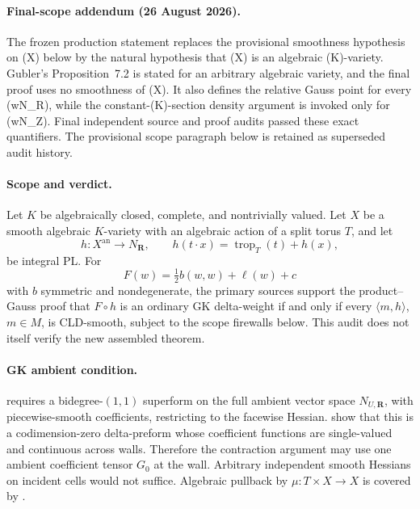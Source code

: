 
\paragraph{Final-scope addendum (26 August 2026).}
The frozen production statement replaces the provisional smoothness
hypothesis on (X) below by the natural hypothesis that (X) is an
algebraic (K)-variety.  Gubler's Proposition~7.2 is stated for an arbitrary
algebraic variety, and the final proof uses no smoothness of (X).  It also
defines the relative Gauss point for every (w\in N_{\mathbf R}), while the
constant-(K)-section density argument is invoked only for
(w\in N\otimes_{\mathbf Z}\Gamma).  Final independent source and proof
audits passed these exact quantifiers.  The provisional scope paragraph
below is retained as superseded audit history.

\paragraph{Scope and verdict.}
Let \(K\) be algebraically closed, complete, and nontrivially valued.
Let \(X\) be a smooth algebraic \(K\)-variety with an algebraic action of a
split torus \(T\), and let
\[
 h:X^{\mathrm{an}}\longrightarrow N_{\mathbf R},
 \qquad
 h(t\mathbin{\cdot}x)=\operatorname{trop}_T(t)+h(x),
\]
be integral PL.  For
\[
 F(w)=\tfrac12 b(w,w)+\ell(w)+c
\]
with \(b\) symmetric and nondegenerate, the primary sources support the
product--Gauss proof that \(F\circ h\) is an ordinary GK delta-weight if and
only if every \(\langle m,h\rangle\), \(m\in M\), is CLD-smooth, subject to
the scope firewalls below.  This audit does not itself verify the new
assembled theorem.

\paragraph{GK ambient condition.}
\cite[Definition~9.9(ii)]{GK17} requires a bidegree-\((1,1)\) superform on
the full ambient vector space \(N_{U,\mathbf R}\), with piecewise-smooth
coefficients, restricting to the facewise Hessian.
\cite[Definition~1.6, Remark~1.7, Example~2.10, and
Remark~9.10]{GK17} show that this is a codimension-zero delta-preform whose
coefficient functions are single-valued and continuous across walls.
Therefore the contraction argument may use one ambient coefficient tensor
\(G_0\) at the wall.  Arbitrary independent smooth Hessians on incident
cells would not suffice.  Algebraic pullback by
\(\mu:T\times X\to X\) is covered by \cite[Proposition~9.15]{GK17}.

